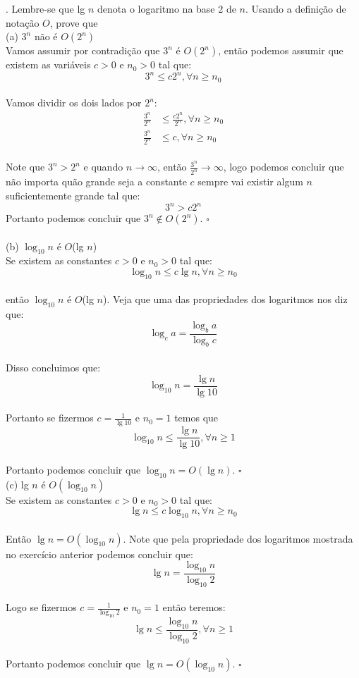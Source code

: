 . Lembre-se que lg $n$ denota o logaritmo na base 2 de $n$. Usando a definição de notação $O$, prove que\\[6pt]
(a) $3^n$ não é $O(2^n)$
\\[6pt]
Vamos assumir por contradição que $3^n$ é $O(2^n)$, então podemos assumir que existem as variáveis $c > 0$ e $n_0 > 0$ tal que:
\[ 3^n \leq c 2^n, \forall n \geq n_0 \]
\\[6pt]
Vamos dividir os dois lados por $2^n$:
\begin{align*}
 \frac{3^n}{2^n} & \leq \frac{c 2^n}{2^n}, \forall n \geq n_0 \\
 \frac{3^n}{2^n} & \leq c, \forall n \geq n_0
\end{align*}
\\[6pt]
Note que $3^n > 2^n$ e quando $n \rightarrow \infty$, então $\frac{3^n}{2^n} \rightarrow \infty$, logo podemos concluir que não importa quão grande seja a constante $c$ sempre vai existir algum $n$ suficientemente grande tal que:
\[ 3^n > c 2^n\]
Portanto podemos concluir que $3^n \not \in O(2^n)$. $\square$\\
\\[6pt]
(b) $\log_{10}n$ é $O$(lg $n$)
\\[6pt]
Se existem as constantes $c > 0$ e $n_0 > 0$ tal que:
\[ \log_{10}n \leq c \lg n, \forall n \geq n_0 \]
\\[6pt]
então $\log_{10}n$ é $O$(lg $n$). Veja que uma das propriedades dos logaritmos nos diz que:
\[ \log_c a = \frac{\log_b a}{\log_b c} \]
\\[6pt]
Disso concluimos que:
\[ \log_{10} n = \frac{\lg n}{\lg 10} \]
\\[6pt]
Portanto se fizermos $c = \frac{1}{\lg 10}$ e $n_0 = 1$ temos que 
\[ \log_{10}n \leq \frac{\lg n}{\lg 10}, \forall n \geq 1  \]
\\[6pt]
Portanto podemos concluir que $\log_{10}n = O(\lg n)$. $\square$
\\[6pt]
(c) lg $n$ é $O(\log_{10}n)$
\\[6pt]
Se existem as constantes $c > 0$ e $n_0 > 0$ tal que:
\[ \lg n \leq c \log_{10} n, \forall n \geq n_0 \]
\\[6pt]
Então $\lg n = O(\log_{10} n)$. Note que pela propriedade dos logaritmos mostrada no exercício anterior podemos concluir que:
\[ \lg n = \frac{\log_{10} n}{\log_{10} 2}\]
\\[6pt]
Logo se fizermos $c = \frac{1}{\log_{10} 2}$ e $n_0 = 1$ então teremos:
\[ \lg n \leq \frac{\log_{10} n}{\log_{10} 2}, \forall n \geq 1 \]
\\[6pt]
Portanto podemos concluir que $\lg n = O(\log_{10} n)$. $\square$
